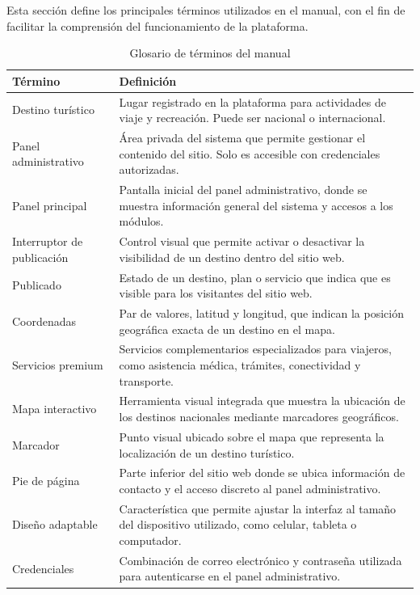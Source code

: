 \documentclass[12pt,letterpaper]{article}
\begin{document}
Esta sección define los principales términos utilizados en el manual, con el fin de facilitar la comprensión del funcionamiento de la plataforma.

\begin{longtable}{|L{0.28\textwidth}|L{0.60\textwidth}|}
\caption{Glosario de términos del manual}\\
\hline
\textbf{Término} & \textbf{Definición} \\
\hline
Destino turístico & Lugar registrado en la plataforma para actividades de viaje y recreación. Puede ser nacional o internacional. \\
\hline
Panel administrativo & Área privada del sistema que permite gestionar el contenido del sitio. Solo es accesible con credenciales autorizadas. \\
\hline
Panel principal & Pantalla inicial del panel administrativo, donde se muestra información general del sistema y accesos a los módulos. \\
\hline
Interruptor de publicación & Control visual que permite activar o desactivar la visibilidad de un destino dentro del sitio web. \\
\hline
Publicado & Estado de un destino, plan o servicio que indica que es visible para los visitantes del sitio web. \\
\hline
Coordenadas & Par de valores, latitud y longitud, que indican la posición geográfica exacta de un destino en el mapa. \\
\hline
Servicios premium & Servicios complementarios especializados para viajeros, como asistencia médica, trámites, conectividad y transporte. \\
\hline
Mapa interactivo & Herramienta visual integrada que muestra la ubicación de los destinos nacionales mediante marcadores geográficos. \\
\hline
Marcador & Punto visual ubicado sobre el mapa que representa la localización de un destino turístico. \\
\hline
Pie de página & Parte inferior del sitio web donde se ubica información de contacto y el acceso discreto al panel administrativo. \\
\hline
Diseño adaptable & Característica que permite ajustar la interfaz al tamaño del dispositivo utilizado, como celular, tableta o computador. \\
\hline
Credenciales & Combinación de correo electrónico y contraseña utilizada para autenticarse en el panel administrativo. \\
\hline
\end{longtable}
\end{document}
